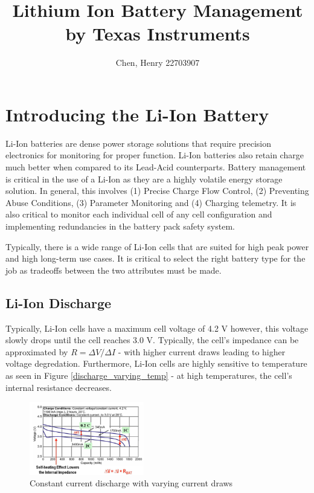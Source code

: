 \documentclass[]{report}
\author{Chen, Henry 22703907}
\title{Lithium Ion Battery Management by Texas Instruments}
\begin{document}
\maketitle

\chapter{Introducing the Li-Ion Battery}
Li-Ion batteries are dense power storage solutions that require precision electronics for monitoring for proper function. Li-Ion batteries also retain charge much better when compared to its Lead-Acid counterparts. Battery management is critical in the use of a Li-Ion as they are a highly volatile energy storage solution. In general, this involves (1) Precise Charge Flow Control, (2) Preventing Abuse Conditions, (3) Parameter Monitoring and (4) Charging telemetry. It is also critical to monitor each individual cell of any cell configuration and implementing redundancies in the battery pack safety system.

Typically, there is a wide range of Li-Ion cells that are suited for high peak power and high long-term use cases. It is critical to select the right battery type for the job as tradeoffs between the two attributes must be made.

\section{Li-Ion Discharge}
Typically, Li-Ion cells have a maximum cell voltage of 4.2 V however, this voltage slowly drops until the cell reaches 3.0 V. Typically, the cell's impedance can be approximated by $R=\Delta V/\Delta I$ - with higher current draws leading to higher voltage degredation. Furthermore, Li-Ion cells are highly sensitive to temperature as seen in Figure \ref{discharge_varying_temp} - at high temperatures, the cell's internal resistance decreases.

\begin{figure}[h]
    \centering
    \includegraphics[width=5cm]{discharge_curve.png}
    \caption{Constant current discharge with varying current draws}
    \label{discharge_varying_current}
\end{figure}
\end{document}
